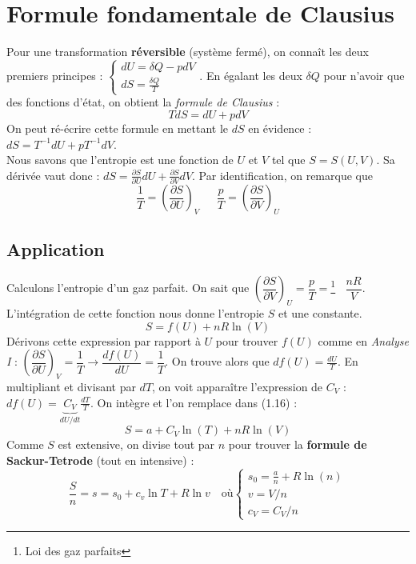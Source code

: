 \documentclass[11pt, a4paper, openany]{book}
\begin{document}
		\section{Formule fondamentale de Clausius}
		Pour une transformation \textbf{réversible} (système fermé), on connaît les deux premiers principes : $\left\{\begin{array}{l}
		dU = \delta Q - pdV\\
		dS = \frac{\delta Q}{T}
		\end{array}\right.$. En égalant les deux $\delta Q$ pour n'avoir que des fonctions d'état, on obtient la \textit{formule de Clausius} :
		\begin{equation}
			TdS = dU + pdV
		\end{equation}
		On peut ré-écrire cette formule en mettant le $dS$ en évidence : $dS = T^{-1}dU + pT^{-1} dV$.\\
		Nous savons que l'entropie est une fonction de $U$ et $V$ tel que $S = S(U,V)$. Sa dérivée vaut donc : $dS = \frac{\partial S}{\partial U}dU + \frac{\partial S}{\partial V}dV$. Par identification, on remarque que
		\begin{equation}
			\frac{1}{T} = \left(\frac{\partial S}{\partial U}\right)_V\ \ \ \ \ \ \ \frac{p}{T} = \left(\frac{\partial S}{\partial V}\right)_U
		\end{equation}
		
		\subsection{Application}
		Calculons l'entropie d'un gaz parfait. On sait que $\left(\dfrac{\partial S}{\partial V}\right)_U = \dfrac{p}{T} =$\footnote{Loi des gaz parfaits}$ \ \ \ \ \dfrac{nR}{V}$.\\
		L'intégration de cette fonction nous donne l'entropie $S$ et une constante.
		\begin{equation}
			S = f(U) + nR\ln(V)
		\end{equation}
		Dérivons cette expression par rapport à $U$ pour trouver $f(U)$ comme en \textit{Analyse I} : $\left(\dfrac{\partial S}{\partial U}\right)_V = \dfrac{1}{T} \rightarrow \dfrac{df(U)}{dU} = \dfrac{1}{T}$.
		On trouve alors que $df(U) = \frac{dU}{T}$. En multipliant et divisant par $dT$, on voit apparaître l'expression de $C_V$ : $df(U) = \underbrace{C_V}_{dU/dt}\frac{dT}{T}$. On intègre et l'on remplace dans (1.16) :
		\begin{equation}
			S = a + C_V\ln(T) + nR\ln(V)
		\end{equation}
		Comme $S$ est extensive, on divise tout par $n$ pour trouver la \textbf{formule de Sackur-Tetrode} (tout en intensive) :
		\begin{equation}
			\frac{S}{n} = s = s_0 + c_v\ln T + R\ln v\quad\text{où}\left\{\begin{array}{l}
			s_0=\frac{a}{n}+R\ln(n)\\
			v=V/n\\
			c_V=C_V/n
			\end{array}\right.
		\end{equation}
		
\end{document}
